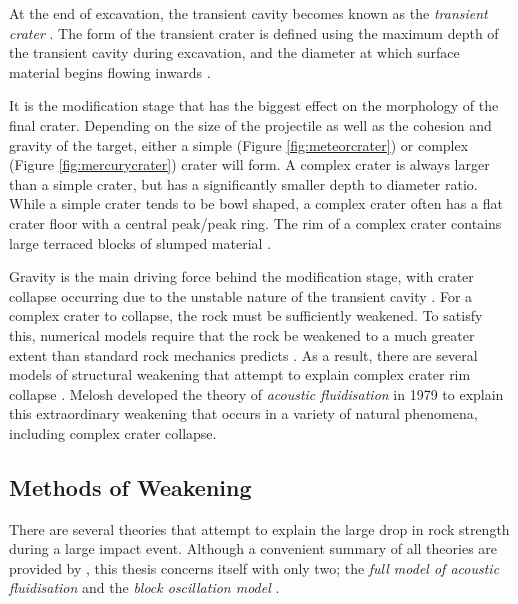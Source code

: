 At the end of excavation, the transient cavity becomes known as the \textit{transient crater} \citep{osinski2012impact}. The form of the transient crater is defined using the maximum depth of the transient cavity during excavation, and the diameter at which surface material begins flowing inwards \citep{turtle2005impact}.\bigskip

It is the modification stage that has the biggest effect on the morphology of the final crater. Depending on the size of the projectile as well as the cohesion and gravity of the target, either a simple (Figure \ref{fig:meteorcrater}) or complex (Figure \ref{fig:mercurycrater}) crater will form. A complex crater is always larger than a simple crater, but has a significantly smaller depth to diameter ratio. While a simple crater tends to be bowl shaped, a complex crater often has a flat crater floor with a central peak/peak ring. The rim of a complex crater contains large terraced blocks of slumped material \citep{osinski2012impact}.\bigskip

Gravity is the main driving force behind the modification stage, with crater collapse occurring due to the unstable nature of the transient cavity \citep{melosh1999impact}. For a complex crater to collapse, the rock must be sufficiently weakened. To satisfy this, numerical models require that the rock be weakened to a much greater extent than standard rock mechanics predicts \citep{mckinnon1978investigation}. As a result, there are several models of structural weakening that attempt to explain complex crater rim collapse \citep{osinski2012impact}. Melosh developed the theory of \textit{acoustic fluidisation} in 1979 to explain this extraordinary weakening that occurs in a variety of natural phenomena, including complex crater collapse.

\subsection{Methods of Weakening \label{subsec:weakening}}


\begin{sloppypar}
There are several theories that attempt to explain the large drop in rock strength during a large impact event. Although a convenient summary of all theories are provided by \citet{osinski2012impact}, this thesis concerns itself with only two; the \textit{full model of acoustic fluidisation} \citep{melosh1979acoustic,melosh1996dynamical} and the \textit{block oscillation model} \citep{ivanov1997block}.
\end{sloppypar}

